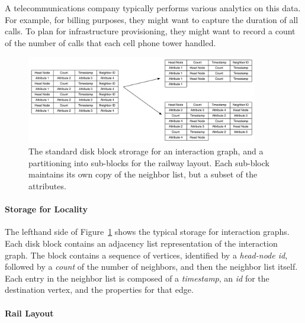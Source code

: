 A telecommunications company typically performs various analytics on this
data. For example, for billing purposes, they might want to capture the
duration of all calls. To plan for infrastructure provisioning, they might want
to record a count of the number of calls that each cell phone tower handled.




\begin{figure}[ht]
\includegraphics[width=0.9\textwidth]{figures/before_after.pdf} 
 \caption{The standard disk block strorage for an interaction graph, and a
   partitioning into sub-blocks for the railway layout. Each sub-block maintains
 its own copy of the neighbor list, but a subset of the attributes.}
 \label{fig:before_after}
 \end{figure}

\paragraph*{Storage for Locality}
%
The lefthand side of Figure~\ref{fig:before_after} shows the typical storage for interaction graphs.
Each disk block contains an adjacency list representation of the interaction
graph. The block contains a sequence of vertices, identified by a
\emph{head-node id}, followed by a \emph{count} of the number of neighbors, and
then the neighbor list itself. Each entry in the neighbor list is composed of a
\emph{timestamp}, an \emph{id} for the destination vertex, and the properties
for that edge. 




\paragraph*{Rail Layout}
%




